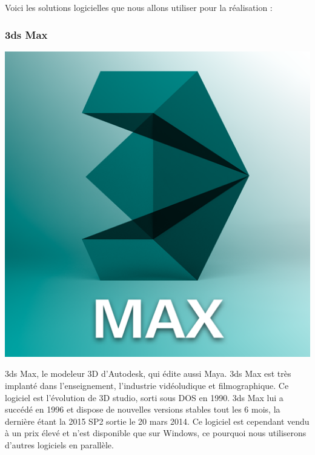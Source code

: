 	Voici les solutions logicielles que nous allons utiliser pour la réalisation :
	\subsubsection{3ds Max}
		\noindent\begin{minipage}{0.2\textwidth}
			\includegraphics[width=\linewidth]{1-PreEtude/img/3dsmax_logo}
			\end{minipage}
			\hfill
			\begin{minipage}{0.8\textwidth}
			3ds Max\cite{3dsmax}, le modeleur 3D d'Autodesk, qui édite aussi Maya. 3ds Max est très implanté dans l'enseignement, l'industrie vidéoludique et filmographique.
			Ce logiciel est l'évolution de 3D studio, sorti sous DOS en 1990. 3ds Max lui a succédé en 1996 et dispose de nouvelles versions stables tout les 6 mois, la dernière étant la 2015 SP2 sortie le 20 mars 2014.
			Ce logiciel est cependant vendu à un prix élevé et n'est disponible que sur Windows, ce pourquoi nous utiliserons d'autres logiciels en parallèle.
		\end{minipage}


